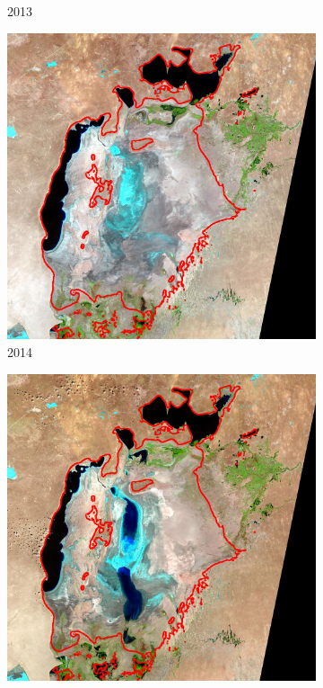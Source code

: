 \documentclass[12pt,a4paper]{article}
\begin{document}
\begin{figure}
\begin{subfigure}[b]{0.19\textwidth}
        \caption{2013}
    \end{subfigure}
    \begin{subfigure}[b]{0.19\textwidth}
        \centering
        \includegraphics[width=\textwidth]{../img/2014o.jpg}
        \caption{2014}
    \end{subfigure}
    \begin{subfigure}[b]{0.19\textwidth}
        \centering
        \includegraphics[width=\textwidth]{../img/2015o.jpg}

\end{subfigure}
\end{figure}
\end{document}

